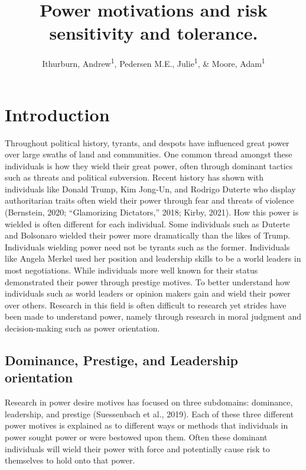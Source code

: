 \documentclass[
  donotrepeattitle,doc, 12pt, a4paper,floatsintext]{apa7}
\title{Power motivations and risk sensitivity and tolerance.}
\author{Ithurburn, Andrew\textsuperscript{1}, Pedersen M.E., Julie\textsuperscript{1}, \& Moore, Adam\textsuperscript{1}}
\date{}
\affiliation{\vspace{0.5cm}\textsuperscript{1} The University of Edinburgh}
\begin{document}
\maketitle

\hypertarget{introduction}{%
\section{Introduction}\label{introduction}}

Throughout political history, tyrants, and despots have influenced great power over large swaths of land and communities. One common thread amongst these individuals is how they wield their great power, often through dominant tactics such as threats and political subversion. Recent history has shown with individuals like Donald Trump, Kim Jong-Un, and Rodrigo Duterte who display authoritarian traits often wield their power through fear and threats of violence (Bernstein, 2020; {``Glamorizing Dictators,''} 2018; Kirby, 2021). How this power is wielded is often different for each individual. Some individuals such as Duterte and Bolsonaro wielded their power more dramatically than the likes of Trump. Individuals wielding power need not be tyrants such as the former. Individuals like Angela Merkel used her position and leadership skills to be a world leaders in most negotiations. While individuals more well known for their status demonstrated their power through prestige motives. To better understand how individuals such as world leaders or opinion makers gain and wield their power over others. Research in this field is often difficult to research yet strides have been made to understand power, namely through research in moral judgment and decision-making such as power orientation.

\hypertarget{dominance-prestige-and-leadership-orientation}{%
\subsection{Dominance, Prestige, and Leadership orientation}\label{dominance-prestige-and-leadership-orientation}}

Research in power desire motives has focused on three subdomains: dominance, leadership, and prestige (Suessenbach et al., 2019). Each of these three different power motives is explained as to different ways or methods that individuals in power sought power or were bestowed upon them. Often these dominant individuals will wield their power with force and potentially cause risk to themselves to hold onto that power.
\end{document}
